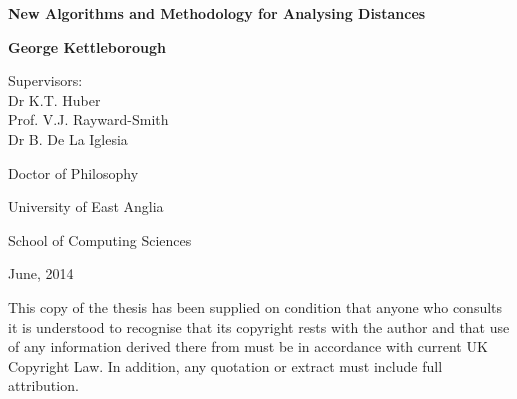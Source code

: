 \documentclass[a4paper,11pt,oneside,final]{book}
\title{\reporttitle}
\author{\reportauthor}
\newcommand{\reporttitle}{New Algorithms and Methodology for Analysing
  Distances}
\newcommand{\reportauthor}{George Kettleborough}
\newcommand{\0}{{\emptyset}}
\begin{document}

\setcounter{page}{1}

\begin{titlepage}
\begin{center}
\vspace*{0.4in}
{\Huge\bfseries\sffamily\reporttitle\par}
\vspace{.7in}
{\large\bfseries\sffamily\reportauthor\par}
\par
\vspace{0.3in}
{ Supervisors:\\
Dr K.T. Huber\\
Prof. V.J. Rayward-Smith\\
Dr B. De La Iglesia}
\par
\vspace{0.4in}
Doctor of Philosophy\\
\par
\vspace{0.4in}
University of East Anglia
\par
\vspace{0.4in}
School of Computing Sciences\\
\par
\vspace{0.3in}
June, 2014
\par
\vspace{0.3in}
\par
\vspace{0.3in}
{\small This copy of the thesis has been supplied on condition
  that anyone who consults it is understood to recognise that its copyright
  rests with the author and that use of any information derived there from
  must be in accordance with current UK Copyright Law. In addition, any
  quotation or extract must include full attribution.}
\end{center}
\end{titlepage}


\newpage

\setcounter{page}{2}



\newpage

\tableofcontents
\newpage

\listoffigures
\newpage
\end{document}
